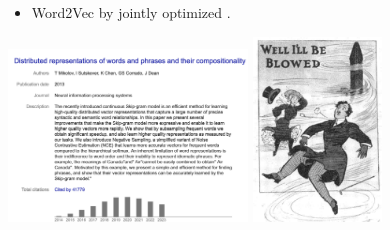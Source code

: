 \documentclass[10pt]{report}
\begin{document}
\begin{itemize}
\item Word2Vec  by jointly optimized
  .
\end{itemize}
\begin{center}
  \includegraphics[width=2.5in]{img/word2vec.png}
  \quad
  \includegraphics[width=1.35in]{img/23-skidoo-flatiron.jpg}
\end{center}
\end{document}
